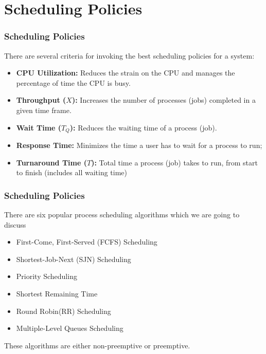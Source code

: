 \section{Scheduling Policies}

\begin{frame}
    \frametitle{Scheduling Policies}

    There are several criteria for invoking the best scheduling policies for a system:

    \begin{itemize}
        \item \textbf{CPU Utilization:} Reduces the strain on the CPU and manages the percentage of time the CPU is busy.
        \item \textbf{Throughput ($X$):} Increases the number of processes (jobs) completed in a given time frame. 
        \item \textbf{Wait Time ($T_Q$):} Reduces the waiting time of a process (job).
        \item \textbf{Response Time:} Minimizes the time a user has to wait for a process to run;
        \item \textbf{Turnaround Time ($T$):} Total time a process (job) takes to run, from start to finish (includes all waiting time)
    \end{itemize}
\end{frame}




\begin{frame}
    \frametitle{Scheduling Policies}

    There are six popular process scheduling algorithms which we are going to discuss

    \begin{itemize}

        \item First-Come, First-Served (FCFS) Scheduling
        \item Shortest-Job-Next (SJN) Scheduling
        \item Priority Scheduling
        \item Shortest Remaining Time
        \item Round Robin(RR) Scheduling
        \item Multiple-Level Queues Scheduling

    \end{itemize}

    These algorithms are either non-preemptive or preemptive.

\end{frame}





